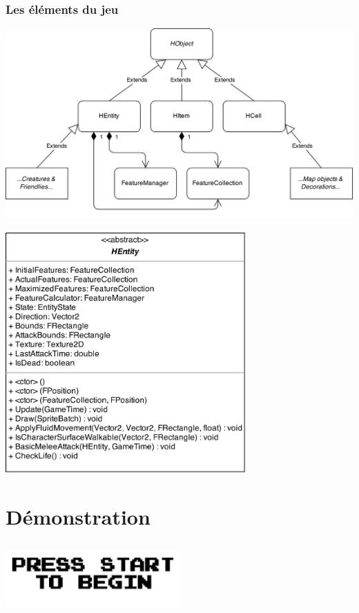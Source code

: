 \documentclass{beamer}
\begin{document}
\begin{frame}
\frametitle{Les éléments du jeu}
\begin{center}
\includegraphics[width=1\textwidth]{img/WorldObjects.png}
\end{center}
\end{frame}
	
\begin{frame}
\begin{center}
\includegraphics[width=0.69\textwidth]{img/HEntity.png}
\end{center}
\end{frame}


\section{Démonstration}
\subsection{}
\begin{frame}
\begin{center}
\includegraphics[width=0.5\textwidth]{img/pres_demo.png}
\end{center}
\end{frame}
\end{document}
